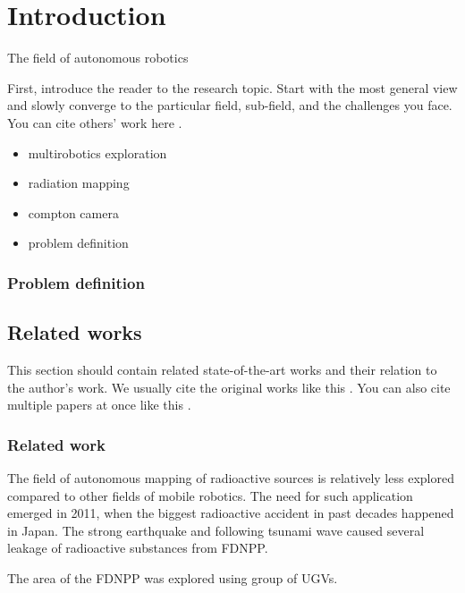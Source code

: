 
\chapter{Introduction\label{chap:introduction}}
The field of autonomous robotics 


First, introduce the reader to the research topic.
Start with the most general view and slowly converge to the particular field, sub-field, and the challenges you face.
You can cite others' work here \cite{baca2021mrs}.

\begin{itemize}
\item multirobotics exploration
\item radiation mapping
\item compton camera
\item problem definition
\end{itemize}

\subsection{Problem definition}



\section{Related works}

This section should contain related state-of-the-art works and their relation to the author's work.
We usually cite the original works like this \cite{benallegue2008high}.
You can also cite multiple papers at once like this \cite{baca2016embedded, baca2021mrs}.

\subsection{Related work}
The field of autonomous mapping of radioactive sources is relatively less explored compared to other fields of mobile robotics. 
The need for such application emerged in 2011, when the biggest radioactive accident in past decades happened in Japan.
The strong earthquake and following tsunami wave caused several leakage of radioactive substances from \ac{FDNPP}.
  
The area of the \ac{FDNPP} was explored using group of \ac{UGV}s. 

